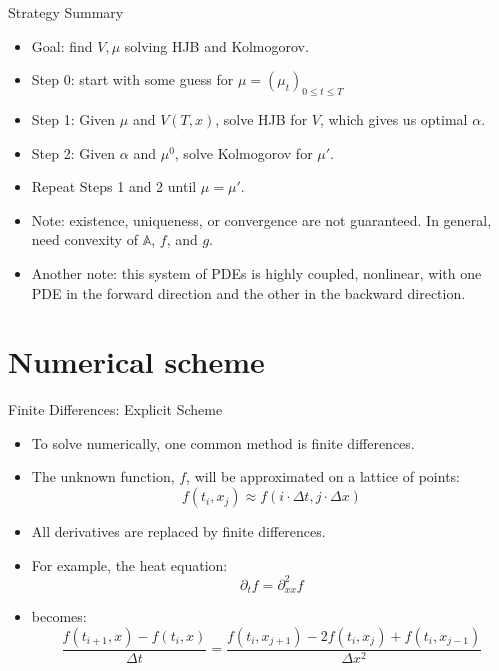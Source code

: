 \documentclass{beamer}
\begin{document}
	\begin{frame}{Strategy Summary}
		\begin{itemize}
			\item {
				Goal: find $V, \mu$ solving HJB and Kolmogorov.
			}
			\item {
				Step 0: start with some guess for $\mu=(\mu_t)_{0 \leq t \leq T}$
			}
			\item {
				Step 1: Given $\mu$ and $V(T,x)$, solve HJB for $V$, which gives us optimal $\alpha$.
			}
			\item {
				Step 2: Given $\alpha$ and $\mu^0$, solve Kolmogorov for $\mu '$.
			}
			\item {
				Repeat Steps 1 and 2 until $\mu = \mu '$.
			}
			\pause
			\item {
				Note: existence, uniqueness, or convergence are not guaranteed. In general, need convexity of $\mathbb{A}$, $f$, and $g$.
			}
			\pause
			\item {
				Another note: this system of PDEs is highly coupled, nonlinear, with one PDE in the forward direction and the other in the backward direction.
			}
		\end{itemize}
	\end{frame}
	
	\section{Numerical scheme}
	
	\begin{frame}{Finite Differences: Explicit Scheme}
		\begin{itemize}
			\item {
				To solve numerically, one common method is finite differences.
			}
			\item {
				The unknown function, $f$, will be approximated on a lattice of points:
				\begin{equation}
					f(t_i,x_j) \approx f(i \cdot \Delta t,j \cdot \Delta x)
				\end{equation}
			}
			\item {
				All derivatives are replaced by finite differences.
			}
			\item {
				For example, the heat equation:
				\begin{equation}
					\partial_t f= \partial_{xx}^2 f
				\end{equation}
			}
			\item {
				becomes:
				\begin{equation}
					\frac{f(t_{i+1},x)-f(t_i,x)}{\Delta t}=\frac{f(t_i,x_{j+1})-2f(t_i,x_j)+f(t_i,x_{j-1})}{\Delta x^2}
				\end{equation}
			}
		\end{itemize}
	\end{frame}
	
\end{document}
